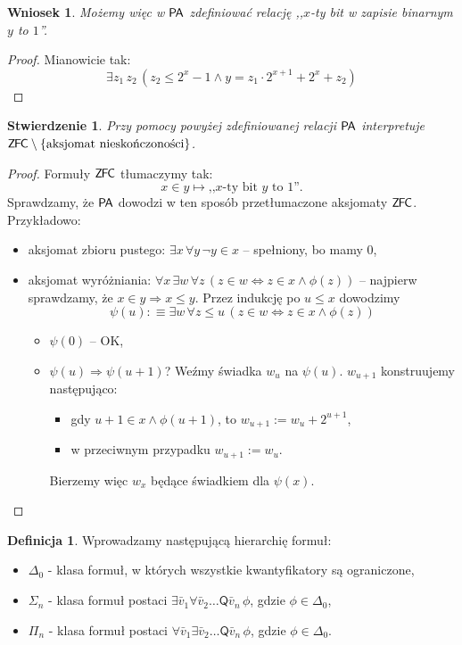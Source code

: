 \documentclass{article}
\theoremstyle{plain}
\newtheorem{stw}[thm]{Stwierdzenie}
\newtheorem{wn}[thm]{Wniosek}
\theoremstyle{definition}
\newtheorem{df}[thm]{Definicja}
\theoremstyle{remark}
\newcommand{\PA}{\mathsf{P \mkern-1.9mu A}}
\newcommand{\ZFC}{\mathsf{Z \mkern-1.6mu F \mkern-1.5mu C}}
\begin{document}
\begin{wn}
	 Możemy więc w $\PA$ zdefiniować relację ,,$x$-ty bit w zapisie binarnym $y$ to $1$''.
\end{wn}
\begin{proof}
	Mianowicie tak:
	\[
		 \exists z_1 \, z_2 \, (z_2 \leq 2^x - 1 \wedge y = z_1 \cdot 2^{x+1} + 2^x + z_2)
	\]

\end{proof}
\begin{stw}
	Przy pomocy powyżej zdefiniowanej relacji $\PA$ interpretuje $\ZFC \setminus \{\text{aksjomat nieskończoności}\}$.
\end{stw}
\begin{proof}
	 Formuły $\ZFC$ tłumaczymy tak:
	 \[
		 x \in y \mapsto \text{,,}x\text{-ty bit }y\text{ to  }1\text{''}.
	 \]
	Sprawdzamy, że $\PA$ dowodzi w ten sposób przetłumaczone aksjomaty $\ZFC$.
	Przykładowo:
	\begin{itemize}
		\item aksjomat zbioru pustego: $\exists x \, \forall y \, \neg y \in x$ -- spełniony, bo mamy $0$,
		\item aksjomat wyróżniania: $\forall x \, \exists w \, \forall z \, (z \in w \Leftrightarrow z \in x \wedge \phi(z))$ --
			najpierw sprawdzamy, że $x \in y \Rightarrow x \leq y$.
			Przez indukcję po $u \leq x$ dowodzimy
			\[
				 \psi(u) :\equiv \exists w \, \forall z \leq u \, (z \in w \Leftrightarrow z \in x \wedge \phi(z))
			\]
			\begin{itemize}
				\item $\psi(0)$ -- OK,
				\item $\psi(u) \Rightarrow \psi(u+1)$?
					Weźmy świadka $w_u$ na $\psi(u)$.
					$w_{u+1}$ konstruujemy następująco:
					\begin{itemize}
						\item gdy $u+1 \in x \wedge \phi(u+1)$, to $w_{u+1} := w_u + 2^{u+1}$,
						\item w przeciwnym przypadku $w_{u+1} := w_u$.
					\end{itemize}
					Bierzemy więc $w_x$ będące świadkiem dla $\psi(x)$.
			\end{itemize}


	\end{itemize}

\end{proof}


\begin{df}
	 Wprowadzamy następującą hierarchię formuł:
\begin{itemize}
\item $\Delta_0$ - klasa formuł, w których wszystkie kwantyfikatory są ograniczone,
\item $\Sigma_n$ - klasa formuł postaci $\exists \bar{v}_1 \forall \bar{v}_2 \ldots \mathsf{Q} \bar{v}_n\, \phi $, gdzie $\phi \in \Delta_0$,
\item $\Pi_n$ - klasa formuł postaci $\forall \bar{v}_1 \exists \bar{v}_2 \ldots \mathsf{Q} \bar{v}_n\, \phi $, gdzie $\phi \in \Delta_0$.
\end{itemize}
\end{df}
\end{document}
